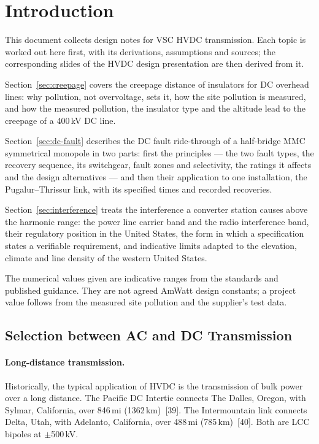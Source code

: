 \section{Introduction}
\label{sec:introduction}

This document collects design notes for VSC HVDC transmission. Each topic is
worked out here first, with its derivations, assumptions and sources; the
corresponding slides of the HVDC design presentation are then derived from
it.

Section~\ref{sec:creepage} covers the creepage distance of insulators for DC
overhead lines: why pollution, not overvoltage, sets it, how the site
pollution is measured, and how the measured pollution, the insulator type and
the altitude lead to the creepage of a 400\,kV DC line.

Section~\ref{sec:dc-fault} describes the DC fault ride-through of a
half-bridge MMC symmetrical monopole in two parts: first the principles ---
the two fault types, the recovery sequence, its switchgear, fault zones and
selectivity, the ratings it affects and the design alternatives --- and then
their application to one installation, the Pugalur--Thrissur link, with its
specified times and recorded recoveries.

Section~\ref{sec:interference} treats the interference a converter station
causes above the harmonic range: the power line carrier band and the radio
interference band, their regulatory position in the United States, the form
in which a specification states a verifiable requirement, and indicative
limits adapted to the elevation, climate and line density of the western
United States.

The numerical values given are indicative ranges from the standards and
published guidance. They are not agreed AmWatt design constants; a project
value follows from the measured site pollution and the supplier's test data.

\subsection{Selection between AC and DC Transmission}
\label{sec:ac-dc-selection}

\paragraph{Long-distance transmission.} Historically, the typical
application of HVDC is the transmission of bulk power over a long distance.
The Pacific DC Intertie connects The Dalles, Oregon, with Sylmar,
California, over 846\,mi (1362\,km)~[39]. The Intermountain link connects
Delta, Utah, with Adelanto, California, over 488\,mi (785\,km)~[40]. Both
are LCC bipoles at $\pm$500\,kV.

